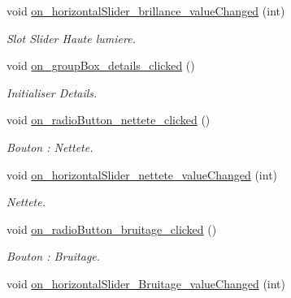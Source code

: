 \begin{DoxyCompactItemize}
void \hyperlink{classMainWindow_a2f09785d376668bf1df5508753e3a66d}{on\+\_\+horizontal\+Slider\+\_\+brillance\+\_\+value\+Changed} (int)
\begin{DoxyCompactList}\small\item\em Slot Slider Haute lumiere. \end{DoxyCompactList}\item 
\mbox{\label{classMainWindow_a38b3e512cfc669706a4238dc17aa8d1f}} 
void \hyperlink{classMainWindow_a38b3e512cfc669706a4238dc17aa8d1f}{on\+\_\+group\+Box\+\_\+details\+\_\+clicked} ()
\begin{DoxyCompactList}\small\item\em Initialiser Details. \end{DoxyCompactList}\item 
\mbox{\label{classMainWindow_a2f78b38c6a3ea4b7d0515b4f10dc2c0e}} 
void \hyperlink{classMainWindow_a2f78b38c6a3ea4b7d0515b4f10dc2c0e}{on\+\_\+radio\+Button\+\_\+nettete\+\_\+clicked} ()
\begin{DoxyCompactList}\small\item\em Bouton \+: Nettete. \end{DoxyCompactList}\item 
\mbox{\label{classMainWindow_a3db26b38033cbb9eb6ff08f6aa50abcb}} 
void \hyperlink{classMainWindow_a3db26b38033cbb9eb6ff08f6aa50abcb}{on\+\_\+horizontal\+Slider\+\_\+nettete\+\_\+value\+Changed} (int)
\begin{DoxyCompactList}\small\item\em Nettete. \end{DoxyCompactList}\item 
\mbox{\label{classMainWindow_a9b6edbac08ead702bbfcd04d6b416831}} 
void \hyperlink{classMainWindow_a9b6edbac08ead702bbfcd04d6b416831}{on\+\_\+radio\+Button\+\_\+bruitage\+\_\+clicked} ()
\begin{DoxyCompactList}\small\item\em Bouton \+: Bruitage. \end{DoxyCompactList}\item 
\mbox{\label{classMainWindow_a9b8d63047bfc67fb655e6a98a1231984}} 
void \hyperlink{classMainWindow_a9b8d63047bfc67fb655e6a98a1231984}{on\+\_\+horizontal\+Slider\+\_\+\+Bruitage\+\_\+value\+Changed} (int)

\end{DoxyCompactItemize}
